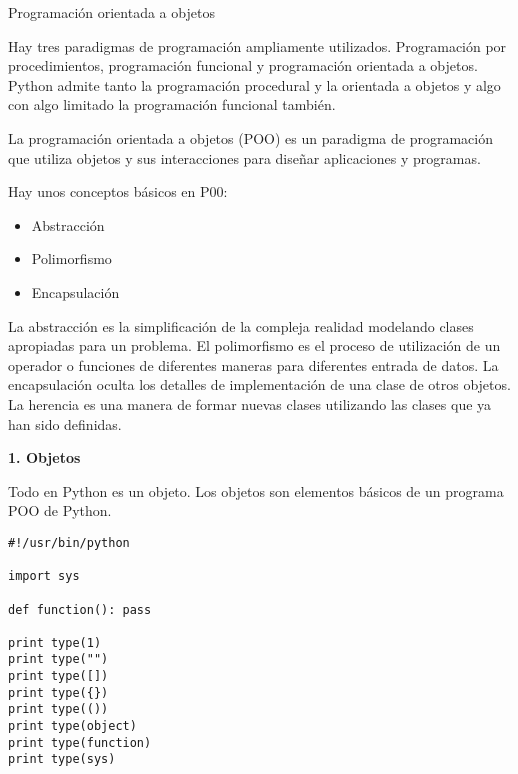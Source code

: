 \documentclass[twoside,10.5pt]{article}%
\begin{document}
\begin{center}
{\LARGE{Programaci\'on orientada a objetos}}\\[20pt]
\end{center}

\vspace{0.3cm}

Hay tres paradigmas de programaci\'on ampliamente utilizados. Programaci\'on por procedimientos, programaci\'on funcional y programaci\'on orientada a objetos. Python admite tanto  la programaci\'on procedural y la  orientada a objetos y  algo con algo limitado  la programaci\'on funcional tambi\'en.

\vspace{0.3cm}

{\color{blue} La programaci\'on orientada a objetos (POO) }es un paradigma de programaci\'on que utiliza objetos y sus interacciones para dise\~nar aplicaciones y programas.

\vspace{0.3cm}

Hay unos conceptos b\'asicos en P00:

\begin{itemize}
\item Abstracci\'on
\item Polimorfismo
\item Encapsulaci\'on

\end{itemize}

\vspace{0.3cm}

La {\color{blue}abstracci\'on} es la simplificaci\'on de la compleja realidad modelando clases apropiadas para un problema. El {\color{blue}polimorfismo} es el proceso de utilizaci\'on de un operador o funciones  de diferentes maneras para diferentes  entrada de datos. La {\color{blue}encapsulaci\'on} oculta los detalles de implementaci\'on de una clase de otros objetos. La {\color{blue} herencia} es una manera de formar nuevas clases utilizando las clases que ya han sido definidas.

\vspace{0.3cm}

\textbf{1. Objetos}

Todo en Python es un objeto. Los objetos son elementos b\'asicos de un programa POO de Python.

\vspace{0.3cm}

\begin{verbatim}
#!/usr/bin/python

import sys

def function(): pass

print type(1)
print type("")
print type([])
print type({})
print type(())
print type(object)
print type(function)
print type(sys)
\end{verbatim}
\end{document}
